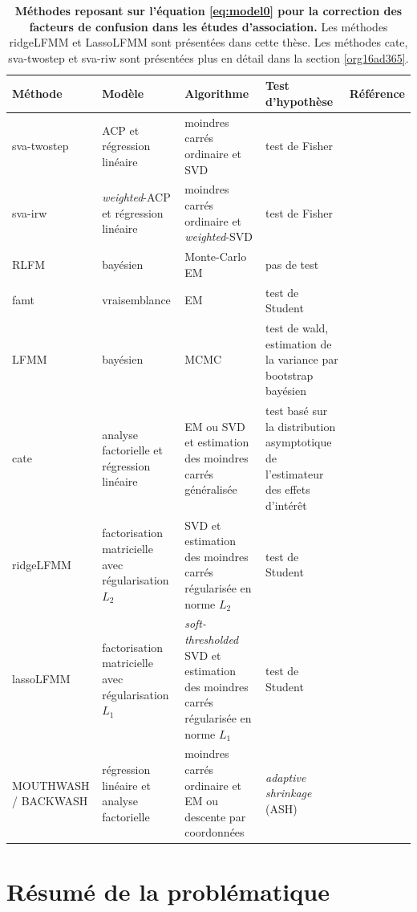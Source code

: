 \documentclass[12pt,a4paper,twoside]{ugathesis}
\begin{document}
\begin{table}
\caption{\label{tab:orgfa5cf07}
\textbf{Méthodes reposant sur l'équation \ref{eq:model0} pour la correction des facteurs de confusion dans les études d'association.} Les méthodes ridgeLFMM et LassoLFMM sont présentées dans cette thèse. Les méthodes cate, sva-twostep et sva-riw sont présentées plus en détail dans la section \ref{org16ad365}.}
\centering
\begin{tabular}{p{3cm}|p{4.2cm}p{4cm}p{5cm}|p{4cm}}
\hline
Méthode & Modèle & Algorithme & Test d'hypothèse & Référence\\
\hline
sva-twostep & ACP et régression linéaire & moindres carrés ordinaire et SVD & test de Fisher & \citet{article_Leek_Storey_2007}\\
sva-irw & \emph{weighted}-ACP et régression linéaire & moindres carrés ordinaire et \emph{weighted}-SVD & test de Fisher & \citet{article_Leek_Storey_2008}\\
RLFM & bayésien & Monte-Carlo EM & pas de test & \citet{agarwal09_regres}\\
famt & vraisemblance & EM & test de Student & \citet{friguet09_factor_model_approac_to_multip}\\
LFMM & bayésien & MCMC & test de wald, estimation de la variance par bootstrap bayésien & \citet{Frichot_2013}\\
cate & analyse factorielle et régression linéaire & EM ou SVD et estimation des moindres carrés généralisée & test basé sur la distribution asymptotique de l'estimateur des effets d'intérêt & \citet{wang2015confounder}\\
ridgeLFMM & factorisation matricielle avec régularisation \(L_{2}\) & SVD et estimation des moindres carrés régularisée en norme \(L_{2}\) & test de Student & \\
lassoLFMM & factorisation matricielle avec régularisation \(L_{1}\) & \emph{soft-thresholded} SVD et estimation des moindres carrés régularisée en norme \(L_{1}\) & test de Student & \\
MOUTHWASH / BACKWASH & régression linéaire et analyse factorielle & moindres carrés ordinaire et EM ou descente par coordonnées & \emph{adaptive shrinkage} (ASH) \citep{stephens16_false_discov_rates} & \citet{gerard2017empirical}\\
\end{tabular}
\end{table}

\section{Résumé de la problématique}
\label{sec:orgf312076}
\end{document}
